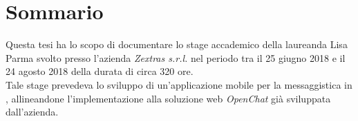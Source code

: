 \cleardoublepage
{}
\chapter*{Sommario}
Questa tesi ha lo scopo di documentare lo stage accademico della laureanda Lisa Parma svolto presso l'azienda \emph{Zextras s.r.l.} nel periodo tra il 25 giugno 2018 e il 24 agosto 2018 della durata di circa 320 ore.\\ 
Tale stage prevedeva lo sviluppo di un'applicazione mobile  per la messaggistica in , allineandone l'implementazione alla soluzione web \emph{OpenChat} già sviluppata dall'azienda.

\thispagestyle{empty}



\bigskip

